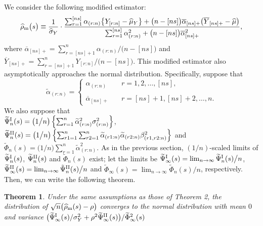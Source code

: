 \documentclass[12pt]{article}
\newtheorem{theorem}{Theorem}
\begin{document}
We consider the following modified estimator: 
\begin{equation} \nonumber 
\widehat{\rho}_{\rm m} 
\big(s \big) \equiv \frac{1}{\widehat{\sigma}_Y} \cdot
 \frac{\sum_{r=1}^{[ns]} \alpha_{(r:n)}\big\{  Y_{[r:n]} -\widehat{\mu}_Y  \big\} + 
\big(n-[ns] \big) \overline{\alpha}_{[ns]+} \big(\overline{Y}_{[ns]+} -\widehat{\mu} \big)}
{\sum_{r=1}^{[ns]} \alpha_{(r:n)}^2 + \big(n-[ns]\big) \overline{\alpha}_{[ns]+}^2},
\end{equation} 
where  $\overline{\alpha}_{[ns]+}=\sum_{r=[ns]+1}^n \alpha_{(r:n)} \big/ \big(n-[ns]\big)$ 
and $\overline{Y}_{[ns]+}=\sum_{r=[ns]+1}^n Y_{[r:n]}\big/ \big(n-[ns]\big)$. This modified
estimator also asymptotically approaches the normal distribution. Specifically, suppose that 
\begin{equation} \nonumber 
\widetilde{\alpha}_{(r:n)}=
\left\{
\begin{array}{ll}
\alpha_{(r:n)} & \quad r=1,2,\ldots,[ns],\\
& \\
\overline{\alpha}_{[ns]+} & \quad r=[ns]+1,[ns]+2,\ldots,n.
\end{array}
\right.
\end{equation}
We also suppose that \\$\widetilde{\Psi}_n^{\rm I} (s)= \big(1\big/n\big) \left\{ \sum_{r=1}^{n} \widetilde{\alpha}_{(r:n)}^2
 \sigma_{(r:n)}^2\right\}$, $\widetilde{\Psi}_n^{\rm II} (s)=\big(1\big/n\big)\left\{
 \sum_{r1=1}^{n} \sum_{r2=1}^{n} \widetilde{\alpha}_{(r1:n)} \widetilde{\alpha}_{(r2:n)}\beta_{(r1,r2:n)}^2
 \right\}$ and 
$\widetilde{\Phi}_n (s)= \big(1 \big/n \big) \sum_{r=1}^{n} \widetilde{\alpha}_{(r:n)}^2$. 
As in the previous section, $(1/n)$-scaled 
limits of $\widetilde{\Psi}_n^{\rm I} (s)$, $\widetilde{\Psi}_n^{\rm II} (s)$ and $\widetilde{\Phi}_n (s)$ exist; let 
 the limits be $\widetilde{\Psi}_{\infty}^{\rm I}(s)= \lim_{n \rightarrow \infty}\widetilde{\Psi}^{\rm I}_n (s)\big/n$, $\widetilde{\Psi}_{\infty}^{\rm II}(s)= \lim_{n \rightarrow \infty}\tilde{\Psi}^{\rm II}_n (s)\big/n$ and 
$\tilde{\Phi}_{\infty}(s)= \lim_{n \rightarrow \infty} \tilde{\Phi}_n (s) \big/n$, respectively. 
Then, we can write the following theorem.  
\begin{theorem}
Under 
the same assumptions as those of Theorem 2, the distribution of $\sqrt{n} \big(\widehat{\rho}_{\rm m} (s) - \rho \big)$ converges 
to the normal distribution with mean $0$ and variance 
 $\big(\widetilde{\Psi}_{\infty}^{\rm I}(s)/\sigma_Y^2+\rho^2\widetilde{\Psi}_{\infty}^{\rm II}(s)\big)/\widetilde{\Phi}_{\infty}^2(s)$
\end{theorem} 
\end{document}
